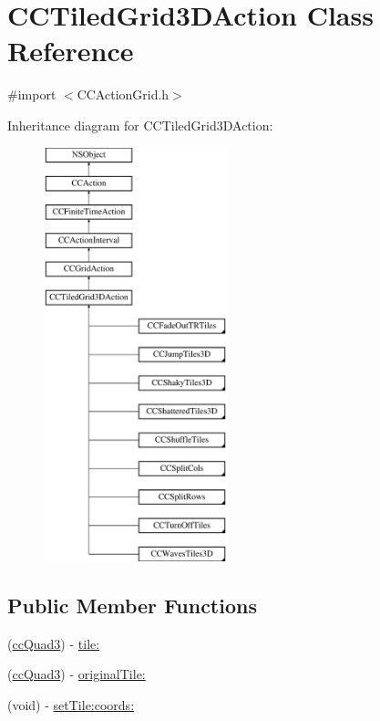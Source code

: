 \hypertarget{interface_c_c_tiled_grid3_d_action}{\section{C\-C\-Tiled\-Grid3\-D\-Action Class Reference}
\label{interface_c_c_tiled_grid3_d_action}
}


{\ttfamily \#import $<$C\-C\-Action\-Grid.\-h$>$}

Inheritance diagram for C\-C\-Tiled\-Grid3\-D\-Action\-:\begin{figure}[H]
\begin{center}
\leavevmode
\includegraphics[height=12.000000cm]{interface_c_c_tiled_grid3_d_action}
\end{center}
\end{figure}
\subsection*{Public Member Functions}
\begin{DoxyCompactItemize}
\item 
(\hyperlink{cc_types_8h_ad1788e6cb4630050d2f69887f812c73d}{cc\-Quad3}) -\/ \hyperlink{interface_c_c_tiled_grid3_d_action_a8fb92b1e25b6519918096eb11da43b17}{tile\-:}
\item 
(\hyperlink{cc_types_8h_ad1788e6cb4630050d2f69887f812c73d}{cc\-Quad3}) -\/ \hyperlink{interface_c_c_tiled_grid3_d_action_a2f51b76294be87cc0dc12bf6e5ae2dec}{original\-Tile\-:}
\item 
(void) -\/ \hyperlink{interface_c_c_tiled_grid3_d_action_a86a27c13695489074589807a49faf794}{set\-Tile\-:coords\-:}
\end{DoxyCompactItemize}


